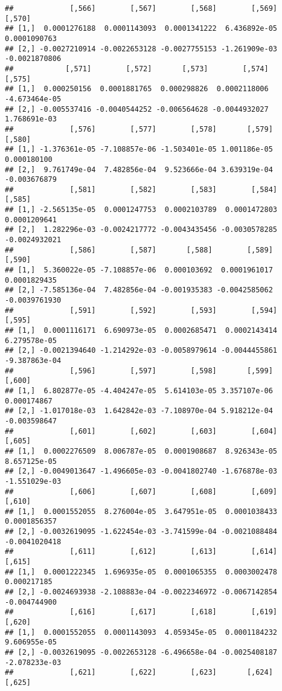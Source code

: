 \documentclass[
]{article}
\begin{document}
\begin{verbatim}
##             [,566]        [,567]        [,568]        [,569]        [,570]
## [1,]  0.0001276188  0.0001143093  0.0001341222  6.436892e-05  0.0001090763
## [2,] -0.0027210914 -0.0022653128 -0.0027755153 -1.261909e-03 -0.0021870806
##            [,571]        [,572]       [,573]        [,574]        [,575]
## [1,]  0.000250156  0.0001881765  0.000298826  0.0002118006 -4.673464e-05
## [2,] -0.005537416 -0.0040544252 -0.006564628 -0.0044932027  1.768691e-03
##             [,576]        [,577]        [,578]       [,579]       [,580]
## [1,] -1.376361e-05 -7.108857e-06 -1.503401e-05 1.001186e-05  0.000180100
## [2,]  9.761749e-04  7.482856e-04  9.523666e-04 3.639319e-04 -0.003676879
##             [,581]        [,582]        [,583]        [,584]        [,585]
## [1,] -2.565135e-05  0.0001247753  0.0002103789  0.0001472803  0.0001209641
## [2,]  1.282296e-03 -0.0024217772 -0.0043435456 -0.0030578285 -0.0024932021
##             [,586]        [,587]       [,588]        [,589]        [,590]
## [1,]  5.360022e-05 -7.108857e-06  0.000103692  0.0001961017  0.0001829435
## [2,] -7.585136e-04  7.482856e-04 -0.001935383 -0.0042585062 -0.0039761930
##             [,591]        [,592]        [,593]        [,594]        [,595]
## [1,]  0.0001116171  6.690973e-05  0.0002685471  0.0002143414  6.279578e-05
## [2,] -0.0021394640 -1.214292e-03 -0.0058979614 -0.0044455861 -9.387863e-04
##             [,596]        [,597]        [,598]       [,599]       [,600]
## [1,]  6.802877e-05 -4.404247e-05  5.614103e-05 3.357107e-06  0.000174867
## [2,] -1.017018e-03  1.642842e-03 -7.108970e-04 5.918212e-04 -0.003598647
##             [,601]        [,602]        [,603]        [,604]        [,605]
## [1,]  0.0002276509  8.006787e-05  0.0001908687  8.926343e-05  8.657125e-05
## [2,] -0.0049013647 -1.496605e-03 -0.0041802740 -1.676878e-03 -1.551029e-03
##             [,606]        [,607]        [,608]        [,609]        [,610]
## [1,]  0.0001552055  8.276004e-05  3.647951e-05  0.0001038433  0.0001856357
## [2,] -0.0032619095 -1.622454e-03 -3.741599e-04 -0.0021088484 -0.0041020418
##             [,611]        [,612]        [,613]        [,614]       [,615]
## [1,]  0.0001222345  1.696935e-05  0.0001065355  0.0003002478  0.000217185
## [2,] -0.0024693938 -2.108883e-04 -0.0022346972 -0.0067142854 -0.004744900
##             [,616]        [,617]        [,618]        [,619]        [,620]
## [1,]  0.0001552055  0.0001143093  4.059345e-05  0.0001184232  9.606955e-05
## [2,] -0.0032619095 -0.0022653128 -6.496658e-04 -0.0025408187 -2.078233e-03
##             [,621]        [,622]        [,623]       [,624]        [,625]

\end{verbatim}
\end{document}
